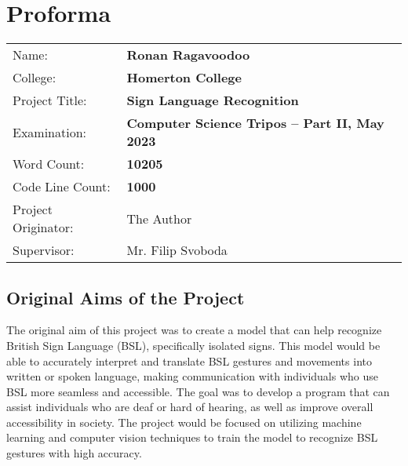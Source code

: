 \documentclass[final,rdr32.tex]{subfiles}
\begin{document}
\pagestyle{plain}

\chapter*{Proforma}

 {\large
  \begin{tabular}{ll}
      Name:               & \bf Ronan Ragavoodoo                             \\
      College:            & \bf Homerton College                             \\
      Project Title:      & \bf Sign Language Recognition                    \\
      Examination:        & \bf Computer Science Tripos -- Part II, May 2023 \\
      Word Count:         & \bf 10205\footnotemark                           \\
      Code Line Count:    & \bf 1000\footnotemark                            \\
      Project Originator: & The Author                                       \\
      Supervisor:         & Mr. Filip Svoboda                                \\
  \end{tabular}
 }


\section*{Original Aims of the Project}


The original aim of this project was to create a model that can help recognize British Sign Language (BSL), specifically isolated signs. This model would be able to accurately interpret and translate BSL gestures and movements into written or spoken language, making communication with individuals who use BSL more seamless and accessible. The goal was to develop a program that can assist individuals who are deaf or hard of hearing, as well as improve overall accessibility in society. The project would be focused on utilizing machine learning and computer vision techniques to train the model to recognize BSL gestures with high accuracy.
\end{document}
